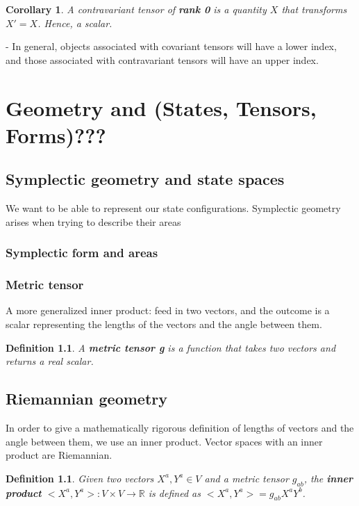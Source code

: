 \documentclass{book}
\newtheorem{defn}[equation]{Definition}
\newtheorem{coro}[equation]{Corollary}
\begin{document}
\begin{coro}
	A contravariant tensor of \textbf{rank 0} is a quantity $X$ that transforms $X' = X$. Hence, a scalar. 
\end{coro}

- In general, objects associated with covariant tensors will have a lower index, and those associated with contravariant tensors will have an upper index. 












\chapter{Geometry and (States, Tensors, Forms)???}


\section{Symplectic geometry and state spaces}
We want to be able to represent our state configurations. Symplectic geometry arises when trying to describe their areas

\subsection{Symplectic form and areas}



\subsection{Metric tensor}
A more generalized inner product: feed in two vectors, and the outcome is a scalar representing the lengths of the vectors and the angle between them. 

\begin{defn}
	A \textbf{metric tensor g} is a function that takes two vectors and returns a real scalar. 
\end{defn}


\section{Riemannian geometry}
In order to give a mathematically rigorous definition of lengths of vectors and the angle between them, we use an inner product. Vector spaces with an inner product are Riemannian.

\begin{defn}
	Given two vectors $X^a,Y^a \in V$ and a metric tensor $g_{ab}$, the \textbf{inner product} $<X^a,Y^a> : V \times V \to \mathbb{R}$ is defined as $<X^a,Y^a> = g_{ab}X^aY^b$. 
\end{defn}
\end{document}
